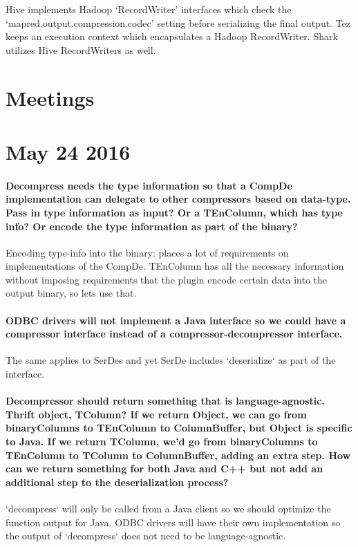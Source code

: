 \documentclass[11pt,a4paper]{article}
\begin{document}
	Hive implements Hadoop `RecordWriter' interfaces which check the \linebreak `mapred.output.compression.codec' setting before serializing the final output.
	Tez keeps an execution context which encapsulates a Hadoop RecordWriter.
	Shark utilizes Hive RecordWriters as well.
	
\pagebreak

\section*{Meetings}

\section*{May 24 2016}
	
	\paragraph{Decompress needs the type information so that a CompDe implementation can delegate to other compressors based on data-type. Pass in type information as input? Or a TEnColumn, which has type info? Or encode the type information as part of the binary?}
	Encoding type-info into the binary: places a lot of requirements on implementations of the CompDe. TEnColumn has all the necessary information without imposing requirements that the plugin encode certain data into the output binary, so lets use that.
	
	\paragraph{ODBC drivers will not implement a Java interface so we could have a compressor interface instead of a compressor-decompressor interface.}
	The same applies to SerDes and yet SerDe includes `deserialize` as part of the interface.
	
	\paragraph{Decompressor should return something that is language-agnostic. Thrift object, TColumn? If we return Object, we can go from binaryColumns to TEnColumn to ColumnBuffer, but Object is specific to Java. If we return TColumn, we'd go from binaryColumns to TEnColumn to TColumn to ColumnBuffer, adding an extra step. How can we return something for both Java and C++ but not add an additional step to the deserialization process?}
	`decompress` will only be called from a Java client so we should optimize the function output for Java. ODBC drivers will have their own implementation so the output of `decompress` does not need to be language-agnostic.
	
\end{document}
